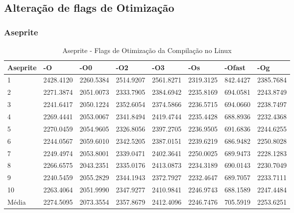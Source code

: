 \clearpage
\subsection{Alteração de flags de Otimização}

\subsubsection*{Aseprite}

\begin{table}[!ht]
\centering
\caption{Aseprite - Flags de Otimização da Compilação no Linux}
\label{tab:otimizacao_compilacao:linux:aseprite}
\begin{tabular}{llllllll}
\textbf{Aseprite} & \textbf{-O}  & \textbf{-O0}   & \textbf{-O2} & \textbf{-O3} & \textbf{-Os} & \textbf{-Ofast} & \textbf{-Og} \\ \toprule
1                 & 2428.4120    & 2260.5384      & 2514.9207    & 2561.8271    & 2319.3125    &    842.4427     & 2385.7684  \\ 
2                 & 2271.3874    & 2051.0073      & 2333.7905    & 2384.6942    & 2235.8169    &    694.0581     & 2243.8749  \\ 
3                 & 2241.6417    & 2050.1224      & 2352.6054    & 2374.5866    & 2236.5715    &    694.0660     & 2238.7497  \\ 
4                 & 2269.4441    & 2053.0067      & 2341.8494    & 2419.4744    & 2235.4428    &    688.8936     & 2232.4368  \\ 
5                 & 2270.0459    & 2054.9605      & 2326.8056    & 2397.2705    & 2236.9505    &    691.6836     & 2244.6255  \\ 
6                 & 2244.0567    & 2059.6010      & 2342.5205    & 2387.0151    & 2239.6219    &    686.9482     & 2250.8028  \\ 
7                 & 2249.4974    & 2053.8001      & 2339.0471    & 2402.3641    & 2250.0025    &    689.9473     & 2228.1283  \\ 
8                 & 2266.6575    & 2043.2351      & 2335.0176    & 2413.0873    & 2234.3189    &    690.0143     & 2230.7049  \\ 
9                 & 2240.5459    & 2055.2829      & 2344.1943    & 2372.7927    & 2232.4647    &    689.7057     & 2233.7111  \\ 
10                & 2263.4064    & 2051.9990      & 2347.9277    & 2410.9841    & 2246.9743    &    688.1589     & 2247.4484  \\ \bottomrule
Média             & 2274.5095    & 2073.3554      & 2357.8679    & 2412.4096    & 2246.7476    &    705.5919     & 2253.6251  \\ 
\end{tabular}
\end{table}

